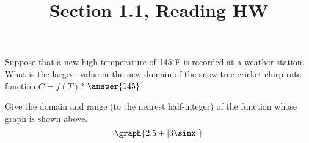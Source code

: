 \documentclass{ximera}
\title{Section 1.1, Reading HW}
\begin{document}
\begin{abstract}
\end{abstract}
\maketitle

\begin{problem}
Suppose that a new high temperature of 145\(^\circ\)F is recorded at a weather station.  What is the largest value in the new domain of the snow tree cricket chirp-rate function \(C=f(T)\)?
    $\answer{145}$

\end{problem}

\begin{problem}
   Give the domain and range (to the nearest half-integer) of the function whose graph is shown above.
   \[
    \graph{2.5+|3\sinx|}
   \]
   
\end{problem}
\end{document}
